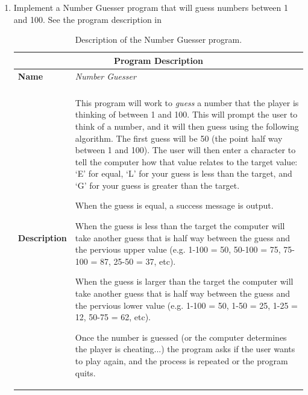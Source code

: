 \begin{enumerate}
  
  \clearpage
  \item Implement a Number Guesser program that will guess numbers between 1 and 100. See the program description in 
  
  \begin{table}[htbp]
  \centering
  \begin{tabular}{l|p{10cm}}
    \hline
    \multicolumn{2}{c}{\textbf{Program Description}} \\
    \hline
    \textbf{Name} & \emph{Number Guesser} \\
    \\
    \textbf{Description} & This program will work to \emph{guess} a number that the player is thinking of between 1 and 100. This will prompt the user to think of a number, and it will then guess using the following algorithm. The first guess will be 50 (the point half way between 1 and 100). The user will then enter a character to tell the computer how that value relates to the target value: `E' for equal, `L' for your guess is less than the target, and `G' for your guess is greater than the target. \newline
    
    When the guess is equal, a success message is output. \newline
    
    When the guess is less than the target the computer will take another guess that is half way between the guess and the pervious upper value (e.g. 1-100 = 50, 50-100 = 75, 75-100 = 87, 25-50 = 37, etc). \newline
    
    When the guess is larger than the target the computer will take another guess that is half way between the guess and the pervious lower value (e.g. 1-100 = 50, 1-50 = 25, 1-25 = 12, 50-75 = 62, etc). \newline
    
    Once the number is guessed (or the computer determines the player is cheating...) the program asks if the user wants to play again, and the process is repeated or the program quits.\\
    \hline
  \end{tabular}
  \caption{Description of the Number Guesser program.}
  \label{tbl:number_guesser}
  \end{table}
  

\end{enumerate}
